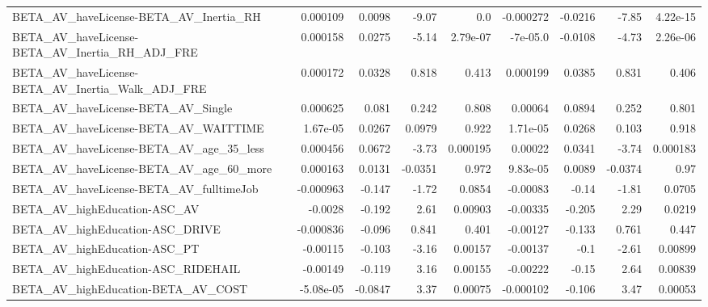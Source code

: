 \begin{tabular}{lrrrrrrrr}
BETA\_AV\_haveLicense-BETA\_AV\_Inertia\_RH             &    0.000109 &       0.0098 &    -9.07 &      0.0 &  -0.000272 &     -0.0216 &        -7.85 &      4.22e-15 \\
BETA\_AV\_haveLicense-BETA\_AV\_Inertia\_RH\_ADJ\_FRE     &    0.000158 &       0.0275 &    -5.14 & 2.79e-07 &   -7e-05.0 &     -0.0108 &        -4.73 &      2.26e-06 \\
BETA\_AV\_haveLicense-BETA\_AV\_Inertia\_Walk\_ADJ\_FRE   &    0.000172 &       0.0328 &    0.818 &    0.413 &   0.000199 &      0.0385 &        0.831 &         0.406 \\
BETA\_AV\_haveLicense-BETA\_AV\_Single                 &    0.000625 &        0.081 &    0.242 &    0.808 &    0.00064 &      0.0894 &        0.252 &         0.801 \\
BETA\_AV\_haveLicense-BETA\_AV\_WAITTIME               &    1.67e-05 &       0.0267 &   0.0979 &    0.922 &   1.71e-05 &      0.0268 &        0.103 &         0.918 \\
BETA\_AV\_haveLicense-BETA\_AV\_age\_35\_less            &    0.000456 &       0.0672 &    -3.73 & 0.000195 &    0.00022 &      0.0341 &        -3.74 &      0.000183 \\
BETA\_AV\_haveLicense-BETA\_AV\_age\_60\_more            &    0.000163 &       0.0131 &  -0.0351 &    0.972 &   9.83e-05 &      0.0089 &      -0.0374 &          0.97 \\
BETA\_AV\_haveLicense-BETA\_AV\_fulltimeJob            &   -0.000963 &       -0.147 &    -1.72 &   0.0854 &   -0.00083 &       -0.14 &        -1.81 &        0.0705 \\
BETA\_AV\_highEducation-ASC\_AV                       &     -0.0028 &       -0.192 &     2.61 &  0.00903 &   -0.00335 &      -0.205 &         2.29 &        0.0219 \\
BETA\_AV\_highEducation-ASC\_DRIVE                    &   -0.000836 &       -0.096 &    0.841 &    0.401 &   -0.00127 &      -0.133 &        0.761 &         0.447 \\
BETA\_AV\_highEducation-ASC\_PT                       &    -0.00115 &       -0.103 &    -3.16 &  0.00157 &   -0.00137 &        -0.1 &        -2.61 &       0.00899 \\
BETA\_AV\_highEducation-ASC\_RIDEHAIL                 &    -0.00149 &       -0.119 &     3.16 &  0.00155 &   -0.00222 &       -0.15 &         2.64 &       0.00839 \\
BETA\_AV\_highEducation-BETA\_AV\_COST                 &   -5.08e-05 &      -0.0847 &     3.37 &  0.00075 &  -0.000102 &      -0.106 &         3.47 &       0.00053 \\

\end{tabular}
